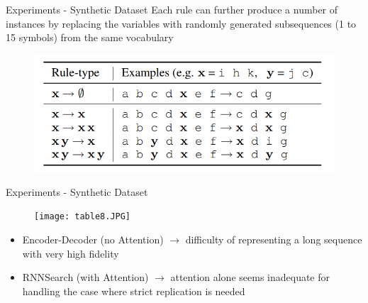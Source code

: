 \documentclass{beamer}
\begin{document}
\begin{frame}{Experiments - Synthetic Dataset}
Each rule can further produce a number
of instances by replacing the variables with
randomly generated subsequences (1 to 15 symbols)
from the same vocabulary
\begin{figure}
    \centering
    \includegraphics[scale=0.9]{syn_rule.PNG}
\end{figure}
\end{frame}

\begin{frame}{Experiments - Synthetic Dataset}
\begin{figure}
    \centering
    \texttt{[image: table8.JPG]}
\end{figure}
\begin{itemize}
    \item Encoder-Decoder (no Attention) $\rightarrow$  difficulty of representing a long sequence with very high fidelity
    \item RNNSearch (with Attention) $\rightarrow$ attention alone seems inadequate for handling the case where strict replication is needed
\end{itemize}
\end{frame}
\end{document}
